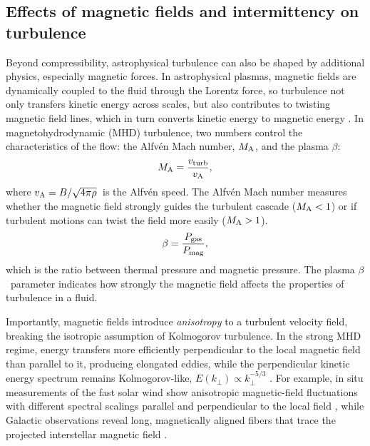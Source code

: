 \subsection{Effects of magnetic fields and intermittency on turbulence}

Beyond compressibility, astrophysical turbulence can also be shaped by additional physics, especially magnetic forces.
In astrophysical plasmas, magnetic fields are dynamically coupled to the fluid through the Lorentz force, so turbulence not only transfers kinetic energy across scales, but also contributes to twisting magnetic field lines, which in turn converts kinetic energy to magnetic energy \citep[e.g.,][]{biskamp_magnetohydrodynamic_2003, beresnyak_mhd_2019}.
In magnetohydrodynamic (MHD) turbulence, two numbers control the characteristics of the flow: the Alfv\'en Mach number, $M_{\rm A}$, and the plasma $\beta$:
\begin{equation}
    M_{\rm A} = \frac{v_{\rm turb}}{v_{\rm A}},
\end{equation}
where $v_{\rm A} = B/\sqrt{4\pi \rho}$\ is the Alfv\'en speed.
The Alfv\'en Mach number measures whether the magnetic field strongly guides the turbulent cascade ($M_{\rm A} < 1$) or if turbulent motions can twist the field more easily ($M_{\rm A} > 1$).
\begin{equation}
    \beta = \frac{P_{\rm gas}}{P_{\rm mag}},
\end{equation}
which is the ratio between thermal pressure and magnetic pressure.
The plasma $\beta$\ parameter indicates how strongly the magnetic field affects the properties of turbulence in a fluid.

Importantly, magnetic fields introduce \textit{anisotropy} to a turbulent velocity field, breaking the isotropic assumption of Kolmogorov turbulence. 
In the strong MHD regime, energy transfers more efficiently perpendicular to the local magnetic field than parallel to it, producing elongated eddies, while the perpendicular kinetic energy spectrum remains Kolmogorov-like, $E(k_{\perp}) \propto k_{\perp}^{-5/3}$ \citep{goldreich_toward_1995}.
For example, in situ measurements of the fast solar wind show anisotropic magnetic-field fluctuations with different spectral scalings parallel and perpendicular to the local field \citep{wicks_power_2010}, while Galactic  observations reveal long, magnetically aligned fibers that trace the projected interstellar magnetic field \citep{clark_magnetically_2014}.

